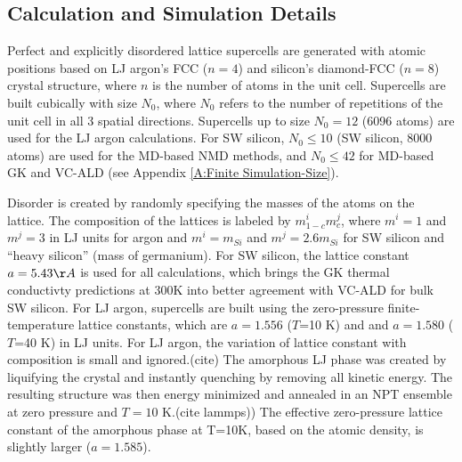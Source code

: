 \documentclass[aps,prb,twocolumn,superscriptaddress,amsmath,amssymb,floatfix]{revtex4}
\begin{document}


\subsection{\label{S:Calculation}Calculation and Simulation Details}

Perfect and explicitly disordered lattice supercells are generated 
with atomic positions 
based on LJ argon's FCC ($n=4$) and silicon's diamond-FCC ($n=8$) 
crystal structure, where $n$ is the number of atoms 
in the unit cell.   
Supercells are built cubically with size $N_0$, where $N_0$ refers to the 
number of repetitions of the unit cell in all 3 
spatial directions. Supercells up to size $N_0 = 12$ 
(6096 atoms) are used for the LJ argon calculations. For SW silicon, 
$N_0 \le 10$ (SW silicon, 8000 atoms) are used for 
the MD-based NMD methods, and $N_0 \le 42$ for MD-based GK and VC-ALD 
(see Appendix \ref{A:Finite Simulation-Size}).  

Disorder is created by randomly specifying the masses of the atoms 
on the lattice. 
The composition of the lattices is labeled by $m^i_{1-c}m^j_{c}$,  
where $m^i=1$ and $m^j=3$ in 
LJ units for argon and $m^i=m_{Si}$ and $m^j=2.6m_{Si}$ 
for SW silicon and ``heavy silicon'' (mass of germanium). 
For SW silicon, the lattice constant $a=5.43 \AA$ is used 
for all calculations, which brings the GK thermal conductivty 
predictions at 300K\cite{goicochea_thermal_2010,he_lattice_2012} 
into better agreement with VC-ALD
\cite{sellan_cross-plane_2010} for bulk SW silicon.
For LJ argon, supercells are built using 
the zero-pressure finite-temperature lattice constants, 
which are $a=1.556$ ($T$=10 K) and 
and $a=1.580$ ($T$=40 K) in LJ units.\cite{mcgaughey_phonon_2004} 
For LJ argon, the variation of lattice constant 
with composition is small and ignored.(cite) 
The amorphous LJ phase was created by liquifying the crystal 
and instantly quenching by removing all kinetic energy.  The resulting 
structure was then energy minimized and annealed in an NPT ensemble at 
zero pressure and $T=10$ K.(cite lammps)) 
The effective zero-pressure lattice constant  
of the amorphous phase at T=10K, based on the atomic 
density, is slightly larger 
($a = 1.585$).\cite{mcgaughey_phonon_2004}  
\end{document}
